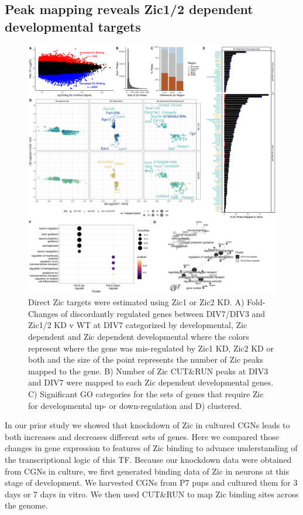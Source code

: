 \documentclass[fleqn,10pt]{wlscirep}
\begin{document}
\subsection*{Peak mapping reveals Zic1/2 dependent developmental targets}
\begin{figure}[!ht]
\includegraphics[width=.95\textwidth]{../figures/figure4.png}
\caption{Direct Zic targets were estimated using Zic1 or Zic2 KD. A) Fold-Changes of discordantly regulated genes between DIV7/DIV3 and Zic1/2 KD v WT at DIV7 categorized by developmental, Zic dependent and Zic dependent developmental where the colors represent where the gene was mis-regulated by Zic1 KD, Zic2 KD or both and the size of the point represents the number of Zic peaks mapped to the gene. B) Number of Zic CUT&RUN peaks at DIV3 and DIV7 were mapped to each Zic dependent developmental genes. C) Significant GO categories for the sets of genes that require Zic for developmental up- or down-regulation and D) clustered. }
\label{fig:ZicKD}
\end{figure}

In our prior study we showed that knockdown of Zic in cultured CGNs leads to both increases and decreases different sets of genes. Here we compared those changes in gene expression to features of Zic binding to advance understanding of the transcriptional logic of this TF. Because our knockdown data were obtained from CGNs in culture, we first generated binding data of Zic in neurons at this stage of development. We harvested CGNs from P7 pups and cultured them for 3 days or 7 days in vitro. We then used CUT&RUN to map Zic binding sites across the genome. 
\end{document}

